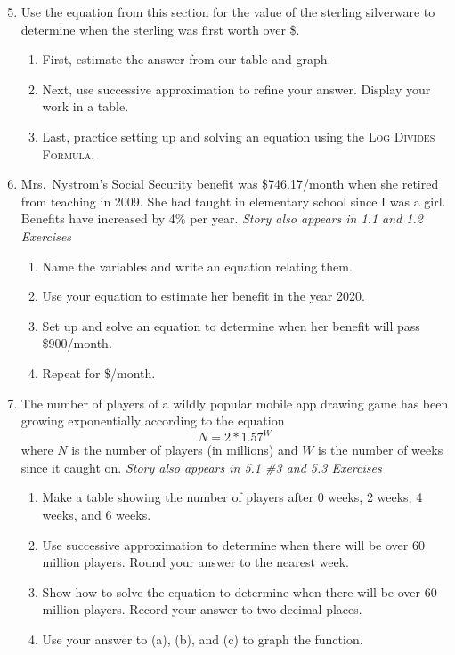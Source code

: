 \begin{enumerate} 
\setcounter{enumi}{4}

\item Use the equation from this section for the value of the sterling silverware to determine when the sterling was first worth over \$.
\begin{enumerate}
\item First, estimate the answer from our table and graph.
\item Next, use successive approximation to refine your answer. Display your work in a table.
\item Last, practice setting up and solving an equation using the \textsc{Log Divides Formula}.
\end{enumerate}

\item Mrs.\ Nystrom's Social Security benefit was \$746.17/month when she retired from teaching in 2009. She had taught in elementary school since I was a girl.   Benefits have increased by 4\% per year.   \hfill \emph{Story also appears in 1.1 and 1.2  Exercises} 
\begin{enumerate}
\item Name the variables and write an equation relating them.
\item Use your equation to estimate her benefit in the year 2020.
\item Set up and solve an equation to determine when her benefit will pass \$900/month.
\item Repeat for \$/month.
\end{enumerate}  

\item The number of players of a wildly popular mobile app drawing game  has been growing exponentially according to the equation $$N = 2 \ast 1.57^W$$ where $N$ is the number of players (in millions) and $W$ is the number of weeks since it caught on.
\hfill \emph{Story also appears in 5.1 \#3 and 5.3 Exercises}
\begin{enumerate}
\item Make a table showing the number of players after 0 weeks, 2 weeks, 4 weeks, and 6 weeks.  
\item Use successive approximation to determine when there will be over 60 million players.  Round your answer to the nearest week.
\item Show how to solve the equation to determine when there will be over 60 million players.  Record your answer to two decimal places.  
\item Use your answer to (a), (b), and (c) to graph the function.
\end{enumerate} 


\end{enumerate}
